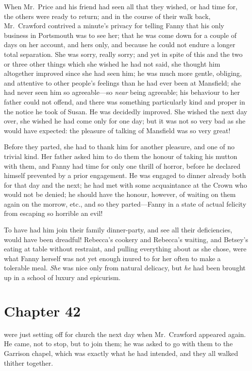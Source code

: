 When Mr.\ Price and his friend had seen all that they wished,
or had time for, the others were ready to return;
and in the course of their walk back, Mr.\ Crawford contrived
a minute's privacy for telling Fanny that his only
business in Portsmouth was to see her; that he was come
down for a couple of days on her account, and hers only,
and because he could not endure a longer total separation.
She was sorry, really sorry; and yet in spite of this and the
two or three other things which she wished he had not said,
she thought him altogether improved since she had seen him;
he was much more gentle, obliging, and attentive to other
people's feelings than he had ever been at Mansfield;
she had never seen him so agreeable---so \emph{near} being agreeable;
his behaviour to her father could not offend, and there
was something particularly kind and proper in the notice
he took of Susan.  He was decidedly improved.  She wished
the next day over, she wished he had come only for one day;
but it was not so very bad as she would have expected:
the pleasure of talking of Mansfield was so very great!

Before they parted, she had to thank him for another pleasure,
and one of no trivial kind.  Her father asked him to do
them the honour of taking his mutton with them, and Fanny
had time for only one thrill of horror, before he declared
himself prevented by a prior engagement.  He was engaged
to dinner already both for that day and the next; he had met
with some acquaintance at the Crown who would not be denied;
he should have the honour, however, of waiting on them
again on the morrow, etc., and so they parted---Fanny in
a state of actual felicity from escaping so horrible an evil!

To have had him join their family dinner-party, and see
all their deficiencies, would have been dreadful!
Rebecca's cookery and Rebecca's waiting, and Betsey's
eating at table without restraint, and pulling everything
about as she chose, were what Fanny herself was not yet
enough inured to for her often to make a tolerable meal.
\emph{She} was nice only from natural delicacy, but \emph{he} had been
brought up in a school of luxury and epicurism.



\chapter{Chapter 42}

 were just setting off for church the next day
when Mr.\ Crawford appeared again.  He came, not to stop,
but to join them; he was asked to go with them to the
Garrison chapel, which was exactly what he had intended,
and they all walked thither together.

